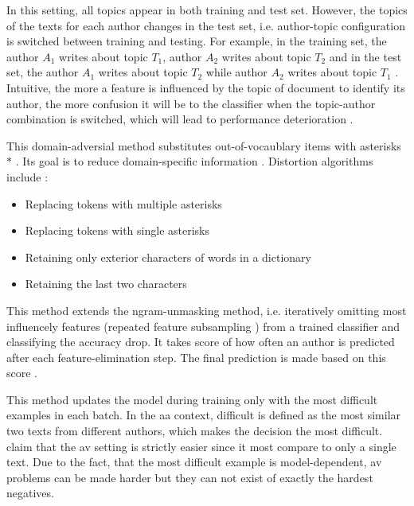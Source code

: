 \begin{definition}
    In this setting, all topics appear in both training and test set. 
    However, the topics of the texts for each author changes in the test set, 
    i.e. author-topic configuration is switched between training and testing.
    For example, in the training set, the author $A_1$ writes about topic $T_1$, author $A_2$ writes about topic $T_2$ 
    and in the test set, 
    the author $A_1$ writes about topic $T_2$ while author $A_2$ writes about topic $T_1$ \cite{tyo_state_2022,altakrori_topic_2021}.
    Intuitive, the more a feature is influenced by the topic of document to identify its author, 
    the more confusion it will be to the classifier when the topic-author combination is switched, which will lead to performance deterioration \cite{altakrori_topic_2021}.
\end{definition}

\begin{definition}
    This domain-adversial method substitutes out-of-vocaublary items with asterisks $*$ \cite{tyo_state_2022}.
    Its goal is to reduce domain-specific information \cite{bischoff_importance_2020}.
    Distortion algorithms include \cite{bischoff_importance_2020}:
    \begin{itemize}
        \item Replacing tokens with multiple asterisks
        \item Replacing tokens with single asterisks
        \item Retaining only exterior characters of words in a dictionary
        \item Retaining the last two characters
    \end{itemize}
\end{definition}

\begin{definition}
    This method extends the ngram-unmasking method, i.e. iteratively omitting most influencely features (repeated feature subsampling \cite{koppel_determining_2014})
    from a trained classifier and classifying the accuracy drop.
    It takes score of how often an author is predicted after each feature-elimination step.
    The final prediction is made based on this score \cite{tyo_state_2022}.
\end{definition}


\begin{definition}
    This method updates the model during training only with the most difficult examples in each batch.
    In the \ac{aa} context, difficult is defined as the most similar two texts from different authors, 
    which makes the decision the most difficult.
    \citet{tyo_state_2022} claim that the \ac{av} setting is strictly easier since 
    it most compare to only a single text.
    Due to the fact, that the most difficult example is model-dependent, \ac{av} problems can be made harder 
    but they can not exist of exactly the hardest negatives.
\end{definition}

